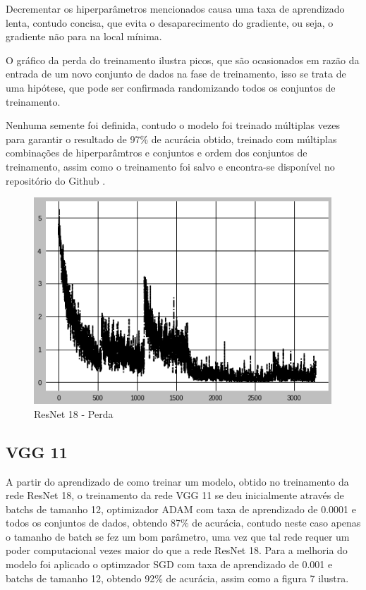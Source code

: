 \documentclass[12pt]{article}
\newcommand\tab[1][1cm]{\hspace*{#1}}
\begin{document}
\tab\tab[0.5pt] Decrementar os hiperparâmetros mencionados causa uma taxa de aprendizado lenta, contudo concisa, que evita o desaparecimento do gradiente, ou seja, o gradiente não para na local mínima.

\tab\tab[0.5pt] O gráfico da perda do treinamento ilustra picos, que são ocasionados em razão da entrada de um novo conjunto de dados na fase de treinamento, isso se trata de uma hipótese, que pode ser confirmada randomizando todos os conjuntos de treinamento.

\tab\tab[0.5pt] Nenhuma semente foi definida, contudo o modelo foi treinado múltiplas vezes para garantir o resultado de 97\% de acurácia obtido, treinado com múltiplas combinações de hiperparâmtros e conjuntos e ordem dos conjuntos de treinamento, assim como o treinamento foi salvo e encontra-se disponível no repositório do Github \cite{Sphinxs}.

\begin{figure}[ht]
\centering
\includegraphics[width=.9\textwidth]{resnet18_loss.png}
\caption{ResNet 18 - Perda}
\label{fig:resnet18loss}
\end{figure}

\subsection{VGG 11}

\tab\tab[0.5pt] A partir do aprendizado de como treinar um modelo, obtido no treinamento da rede ResNet 18, o treinamento da rede VGG 11 se deu inicialmente através de batchs de tamanho 12, optimizador ADAM com taxa de aprendizado de 0.0001 e todos os conjuntos de dados, obtendo 87\% de acurácia, contudo neste caso apenas o tamanho de batch se fez um bom parâmetro, uma vez que tal rede requer um poder computacional vezes maior do que a rede ResNet 18. Para a melhoria do modelo foi aplicado o optimzador SGD com taxa de aprendizado de 0.001 e batchs de tamanho 12, obtendo 92\% de acurácia, assim como a figura 7 ilustra.
\end{document}
